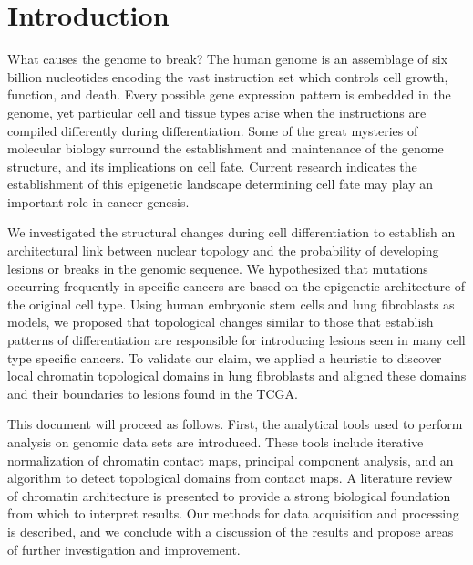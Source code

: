 
\chapter{Introduction}

What causes the genome to break?  The human genome is an assemblage of six billion nucleotides encoding the vast instruction set
which controls cell growth, function, and death.  Every possible gene expression pattern is embedded in the genome, yet particular
cell and tissue types arise when the instructions are compiled differently during differentiation.  Some of the great mysteries
of molecular biology surround the establishment and maintenance of the genome structure, and its implications on cell fate.  
Current research indicates the establishment of this \gls{epigenetic} landscape determining cell fate may play an important
role in cancer genesis.

We investigated the structural changes during cell differentiation to establish an architectural link between
nuclear topology and the probability of developing lesions or breaks in the genomic sequence.  We hypothesized that mutations
occurring frequently in specific cancers are based on the epigenetic architecture of the original cell type.  Using human
embryonic stem cells and lung fibroblasts as models, we proposed that topological changes similar to those that establish
patterns of differentiation are responsible for introducing lesions seen in many cell type specific cancers.  To validate our
claim, we applied a heuristic to discover local chromatin topological domains in lung fibroblasts and aligned these domains and
their boundaries to lesions found in the \gls{TCGA}.

This document will proceed as follows.  First, the analytical tools used to perform analysis on genomic data sets are introduced.
These tools include iterative normalization of chromatin contact maps, principal component analysis, and an algorithm to detect
topological domains from contact maps.  A literature review of chromatin architecture is presented to
provide a strong biological foundation from which to interpret results.  Our methods for data acquisition and processing is
described, and we conclude with a discussion of the results and propose areas of further investigation and improvement.
